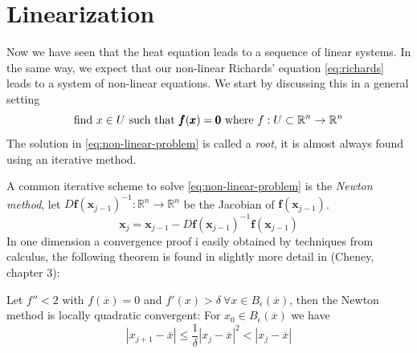 \documentclass[../Main/main.tex]{subfiles}
\begin{document}
	\section*{Linearization}
Now we have seen that the heat equation leads to a sequence of linear systems. In the same way, we expect that our non-linear Richards' equation \eqref{eq:richards} leads to a system of non-linear equations. We start by discussing this in a general setting
\begin{equation}\label{eq:non-linear-problem}
	\text{find }x\in U \text{ such that }\pmb{f}(\pmb{x})=\pmb{0} \\ \text{ where } f:U\subset\mathbb{R}^n\rightarrow\mathbb{R}^n
\end{equation}
The solution in \eqref{eq:non-linear-problem} is called a \emph{root}, it is almost always found using an iterative method.\par 
A common iterative scheme to solve \eqref{eq:non-linear-problem} is the \emph{Newton method}, let $D\pmb{f}(\pmb{x}_{j-1})^{-1}:\mathbb{R}^n\rightarrow\mathbb{R}^n$ be the Jacobian of $\pmb{f}(\pmb{x}_{j-1})$.
\begin{equation}
	\pmb{x}_j = \pmb{x}_{j-1} -D\pmb{f}(\pmb{x}_{j-1})^{-1}\pmb{f}(\pmb{x}_{j-1})
\end{equation}
In one dimension a convergence proof i easily obtained by techniques from calculus, the following theorem is found in  slightly more detail in (Cheney\cite{Cheney}, chapter 3):
\begin{theorem}
	Let $f''<2$ with $f(\overline{x})=0$ and $f'(x)> \delta \ \forall x \in B_{\epsilon}(\overline{x})$, then the Newton method is locally quadratic convergent:  For $x_0\in B_{\epsilon}(\overline{x})$ we have
	\begin{equation}
		| x_{j+1}-\overline{x}| \leq \frac{1}{\delta}|x_j - \overline{x}|^2< |x_j-\overline{x}|
	\end{equation}
\end{theorem}
\end{document}
